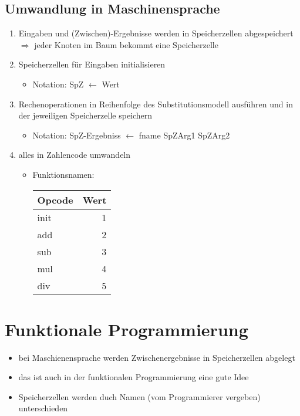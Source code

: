 \documentclass[a4paper]{scrartcl}
\begin{document}
\subsection{Umwandlung in Maschinensprache}
\label{sec-6-1}
\begin{enumerate}
\item Eingaben und (Zwischen)-Ergebnisse werden in Speicherzellen abgespeichert $\Rightarrow$ jeder Knoten im Baum bekommt eine Speicherzelle
\item Speicherzellen für Eingaben initialisieren
\begin{itemize}
\item Notation: SpZ $\leftarrow$ Wert
\end{itemize}
\item Rechenoperationen in Reihenfolge des Substitutionsmodell ausführen und in der jeweiligen Speicherzelle speichern
\begin{itemize}
\item Notation: SpZ-Ergebniss $\leftarrow$ fname SpZArg1 SpZArg2
\end{itemize}
\item alles in Zahlencode umwandeln
\begin{itemize}
\item Funktionsnamen:
\begin{center}
\begin{tabular}{lr}
Opcode & Wert\\
\hline
init & 1\\
add & 2\\
sub & 3\\
mul & 4\\
div & 5\\
\end{tabular}
\end{center}
\end{itemize}
\end{enumerate}
\section{Funktionale Programmierung}
\label{sec-7}
\begin{itemize}
\item bei Maschienensprache werden Zwischenergebnisse in Speicherzellen abgelegt
\item das ist auch in der funktionalen Programmierung eine gute Idee
\item Speicherzellen werden duch Namen (vom Programmierer vergeben) unterschieden
\end{itemize}
\end{document}
